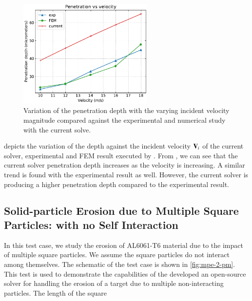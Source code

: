 \begin{figure}[!htpb]
  \centering
  \includegraphics[width=0.6\textwidth]{figures/erosion/figures/cao_xuerui_2022_spherical_particle_impact_3d/penetration_vs_velocity}
  \caption{Variation of the penetration depth with the varying incident velocity
    magnitude compared against the experimental and numerical study with the
    current solve.}
  \label{fig:results-sphere-target-impact-vel-vs-depth}
\end{figure}
 depicts the variation of
the depth against the incident velocity $\mathbf{V}_i$ of the current solver,
experimental and FEM result executed by \textcite{zang2022investigation}. From
, we can see that the
current solver penetration depth increases as the velocity is increasing. A
similar trend is found with the experimental result as well. However, the
current solver is producing a higher penetration depth compared to the
experimental result.

\subsection{Solid-particle Erosion due to Multiple Square Particles: with no Self
  Interaction}
\label{sec:res:mpe-2}
In this test case, we study the erosion of AL6061-T6 material due to the
impact of multiple square particles. We assume the square particles do not
interact among themselves. The schematic of the test case is shown in
\cref{fig:mpe-2-pm}. This test is used to demonstrate the capabilities of the
developed an open-source solver for handling the erosion of a target due to multiple
non-interacting particles. The length of the square

